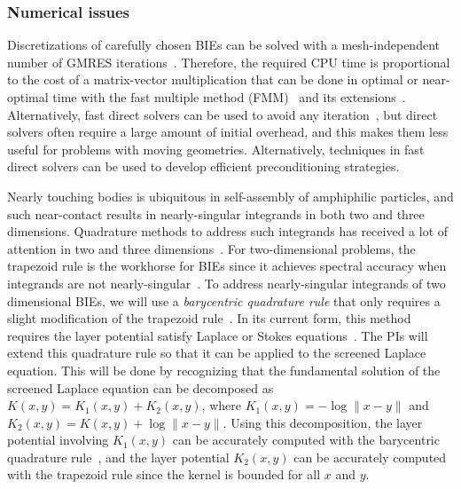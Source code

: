 \subsubsection{Numerical issues}
\label{subsec:NumericalIssues}

Discretizations of carefully chosen BIEs can be solved with a
mesh-independent number of GMRES
iterations~\cite{cam-ips-kel-mey-xue1996}. Therefore, the required CPU
time is proportional to the cost of a matrix-vector multiplication that
can be done in optimal or near-optimal time with the fast multiple
method (FMM)~\cite{fmm5} and its extensions~\cite{fmm1, fmm2, fmm3,
fmm4, fmm6, fmm7, fmm8}. Alternatively, fast direct solvers can be used
to avoid any iteration~\cite{fds1, fds2, fds3, fds4, fds5, fds6, fds7,
fds8, ho2016cpam2, ho2016cpam1, minden2016, minden2017siammms}, but
direct solvers often require a large amount of initial overhead, and
this makes them less useful for problems with moving geometries. Alternatively, techniques in fast direct solvers can be used to develop
efficient preconditioning strategies.

Nearly touching bodies is ubiquitous in self-assembly of amphiphilic
particles, and such near-contact results in nearly-singular integrands
in both two and three dimensions. Quadrature methods to address such
integrands has received a lot of attention in two and three
dimensions~\cite{alpert, kapur, sidi, duffy, bruno1, bruno2, davis_1984,
graglia_2008, hackbusch_sauter_1994, jarvenpaa_2003, khayat_2005,
schwab_1992, ying_2006, beale1, beale2, goodman_1990, haroldson_1998,
lowengrub_1993, schwab_1992, ggq1, ggq2, ggq3, helsing_2008a,
helsing_integral_2009, helsing_tutorial_2012, klockner2013jcp, qbx2,
wala2019jcp, af2018sisc, siegel2018jcp, rachh2017jcp, ding2019arxiv,
bar2014}. For two-dimensional problems, the trapezoid rule is the
workhorse for BIEs since it achieves spectral accuracy when integrands
are not nearly-singular~\cite{tre-wei2014}. To address nearly-singular
integrands of two dimensional BIEs, we will use a {\em barycentric
quadrature rule} that only requires a slight modification of the
trapezoid rule~\cite{ioa-pap-per1991}. In its current form, this method
requires the layer potential satisfy Laplace or Stokes
equations~\cite{bar-wu-vee2015, chi-moo-qua2020}. The PIs will extend
this quadrature rule so that it can be applied to the screened Laplace
equation. This will be done by recognizing that the fundamental solution
of the screened Laplace equation can be decomposed as $K(x,y) = K_1(x,y)
+ K_2(x,y)$, where $K_1(x,y) = -\log\|x - y\|$ and $K_2(x,y) = K(x,y) +
\log\|x - y\|$. Using this decomposition, the layer potential involving
$K_1(x,y)$ can be accurately computed with the barycentric quadrature
rule~\cite{ioa-pap-per1991}, and the layer potential $K_2(x,y)$ can be
accurately computed with the trapezoid rule since the kernel is bounded
for all $x$ and $y$.

